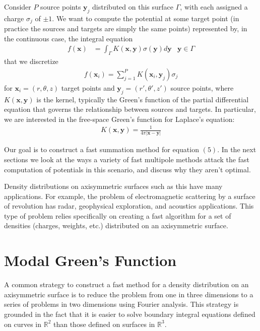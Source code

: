 \documentclass[11pt, oneside]{article}   	%
\begin{document}
Consider $P$ source points $\mathbf{y}_j$ distributed on this surface $\Gamma$, with each assigned a charge $\sigma_j$ of $\pm 1$. We want to compute the potential at some target point (in practice the sources and targets are simply the same points) represented by, in the continuous case, the integral equation
\begin{align}
f(\mathbf{x}) &= \int_\Gamma K(\mathbf{x},\mathbf{y})\sigma(\mathbf{y}) d\mathbf{y} &\mathbf{y}\in\Gamma
\end{align}
that we discretize
\begin{align}
f(\mathbf{x}_i) = \sum_{j=1}^P K(\mathbf{x}_i,\mathbf{y}_j)\sigma_j
\end{align}
for $\mathbf{x}_i=(r,\theta,z)$ target points and $\mathbf{y}_j=(r',\theta',z')$ source points, where $K(\mathbf{x},\mathbf{y})$ is the kernel, typically the Green's function of the partial differential equation that governs the relationship between sources and targets. In particular, we are interested in the free-space Green's function for Laplace's equation:
\begin{align}
K(\mathbf{x},\mathbf{y}) = \frac{1}{4\pi |\mathbf{x}-\mathbf{y}|}
\end{align}

Our goal is to construct a fast summation method for equation $(5)$. In the next sections we look at the ways a variety of fast multipole methods attack the fast computation of potentials in this scenario, and discuss why they aren't optimal.

Density distributions on axisymmetric surfaces such as this have many applications. For example, the problem of electromagnetic scattering by a surface of revolution has radar, geophysical exploration, and acoustics applications. This type of problem relies specifically on creating a fast algorithm for a set of densities (charges, weights, etc.) distributed on an axisymmetric surface.

\section{Modal Green's Function}

A common strategy to construct a fast method for a density distribution on an axisymmetric surface is to reduce the problem from one in three dimensions to a series of problems in two dimensions using Fourier analysis. This strategy is grounded in the fact that it is easier to solve boundary integral equations defined on curves in $\mathbb{R}^2$ than those defined on surfaces in $\mathbb{R}^3$.
\end{document}
